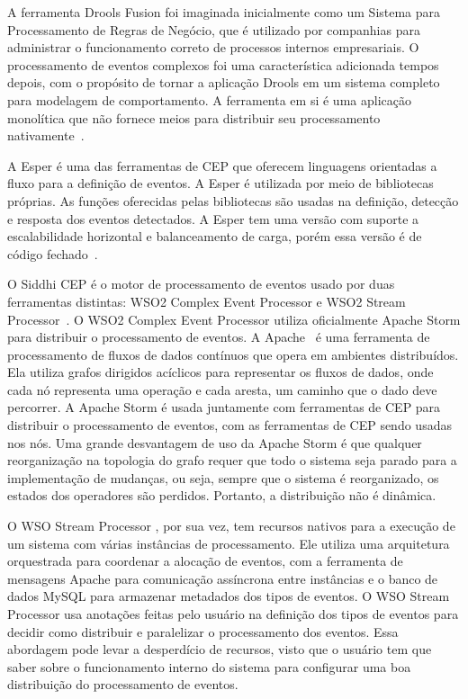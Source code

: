 A ferramenta Drools Fusion foi imaginada inicialmente como um Sistema para Processamento de Regras de Negócio, que é utilizado por companhias para administrar o funcionamento correto de processos internos empresariais. O processamento de eventos complexos foi uma característica adicionada tempos depois, com o propósito de tornar a aplicação Drools em um sistema completo para modelagem de comportamento. A ferramenta em si é uma aplicação monolítica que não fornece meios para distribuir seu processamento nativamente~\citep{DroolsFusion}. %

A Esper é uma das ferramentas de CEP que oferecem linguagens orientadas a fluxo para a definição de eventos. A Esper é utilizada por meio de bibliotecas próprias. As funções oferecidas pelas bibliotecas são usadas na definição, detecção e resposta dos eventos detectados. A Esper tem uma versão com suporte a escalabilidade horizontal e balanceamento de carga, porém essa versão é de código fechado~\citep{ESPERMatrix}.

O Siddhi CEP é o motor de processamento de eventos usado
por duas ferramentas distintas: WSO2 Complex Event Processor e WSO2 Stream Processor~\citep{WSO2vsSiddhi}.
O WSO2 Complex Event Processor \citep{WSO2CEP} utiliza oficialmente  Apache Storm para distribuir o processamento de eventos. A Apache~\cite{Storm} é uma ferramenta de processamento de fluxos de dados contínuos que opera em ambientes distribuídos. Ela utiliza grafos dirigidos acíclicos para representar os fluxos de dados, onde cada nó representa uma operação e cada aresta, um caminho que o dado deve percorrer. A Apache Storm é usada juntamente com ferramentas de CEP para distribuir o processamento de eventos, com as ferramentas de CEP sendo usadas nos nós. Uma grande desvantagem de uso da Apache Storm é que qualquer reorganização na topologia do grafo requer que todo o sistema seja parado para a implementação de mudanças, ou seja, sempre que o sistema é reorganizado, os estados dos operadores são perdidos. Portanto, a distribuição não é dinâmica.

O WSO Stream Processor \citep{WSO2SP}, por sua vez, tem recursos nativos para a execução de um sistema com várias instâncias de processamento. Ele utiliza uma arquitetura orquestrada para coordenar a alocação de eventos, com a ferramenta de mensagens Apache \cite{Kafka} para comunicação assíncrona entre instâncias e o banco de dados MySQL para armazenar metadados dos tipos de eventos. O WSO Stream Processor usa anotações feitas pelo usuário na definição dos tipos de eventos para decidir como distribuir e paralelizar o processamento dos eventos. Essa abordagem pode levar a desperdício de recursos, visto que o usuário tem que saber sobre o funcionamento interno do sistema para configurar uma boa distribuição do processamento de eventos.



